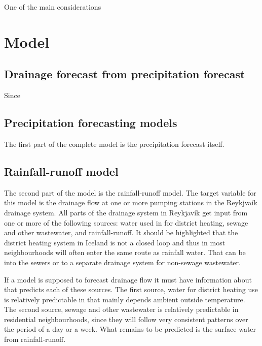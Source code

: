 \cite{hess-17-863-2013}

One of the main considerations 


\section{Model}


\subsection{Drainage forecast from precipitation forecast}
Since 


\subsection{Precipitation forecasting models}
The first part of the complete model is the precipitation forecast itself. 



\subsection{Rainfall-runoff model}
The second part of the model is the rainfall-runoff model. The target variable for this model is the drainage flow at one or more pumping stations in the Reykjvaík drainage system. All parts of the drainage system in Reykjavík get input from one or more of the following sources: water used in for district heating, sewage and other wastewater, and rainfall-runoff. It should be highlighted that the district heating system in Iceland is not a closed loop and thus in most neighbourhoods will often enter the same route as rainfall water. That can be into the sewers or to a separate drainage system for non-sewage wastewater. 

If a model is supposed to forecast drainage flow it must have information about that predicts each of these sources. The first source, water for district heating use is relatively predictable in that mainly depends ambient outside temperature. The second source, sewage and other wastewater is relatively predictable in residential neighbourhoods, since they will follow very consistent patterns over the period of a day or a week. What remains to be predicted is the surface water from rainfall-runoff. 

